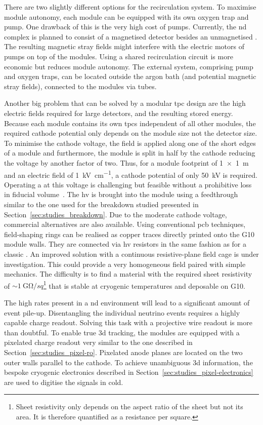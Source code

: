 There are two slightly different options for the recirculation system.
To maximise module autonomy, each module can be equipped with its own oxygen trap and \lar{} pump.
One drawback of this is the very high cost of \lar{} pumps.
Currently, the \dune{} \gls{nd} complex is planned to consist of a magnetised detector besides an unmagnetised \lartpc{}.
The resulting magnetic stray fields might interfere with the electric motors of \lar{} pumps on top of the modules.
Using a shared recirculation circuit is more economic but reduces module autonomy.
The external system, comprising pump and oxygen traps, can be located outside the argon bath (and potential magnetic stray fields), connected to the modules via tubes.

Another big problem that can be solved by a modular \gls{tpc} design are the high electric fields required for large detectors, and the resulting stored energy.
Because each module contains its own \glspl{tpc} independent of all other modules, the required cathode potential only depends on the module size not the detector size.
To minimise the cathode voltage, the field is applied along one of the short edges of a module and furthermore, the module is split in half by the cathode reducing the voltage by another factor of two.
Thus, for a module footprint of \SI{1 x 1}{\metre} and an electric field of \SI{1}{\kilo\volt\per\centi\metre}, a cathode potential of only \SI{50}{\kilo\volt} is required.
Operating a \lartpc{} at this voltage is challenging but feasible without a prohibitive loss in fiducial volume~\cite{AT}.
The \gls{hv} is brought into the module using a feedthrough similar to the one used for the breakdown studied presented in Section~\ref{sec:studies_breakdown}.
Due to the moderate cathode voltage, commercial alternatives are also available.
Using conventional \gls{pcb} techniques, field-shaping rings can be realised as copper traces directly printed onto the G10 module walls.
They are connected via \gls{hv} resistors in the same fashion as for a classic \lartpc{}.
An improved solution with a continuous resistive-plane field cage is under investigation.
This could provide a very homogeneous field paired with simple mechanics.
The difficulty is to find a material with the required sheet resistivity of $\sim{\SI{1}{\giga\ohm\per sq}}$\footnote{Sheet resistivity only depends on the aspect ratio of the sheet but not its area. It is therefore quantified as a resistance per square.} that is stable at cryogenic temperatures and deposable on G10.

The high rates present in a \gls{nd} environment will lead to a significant amount of event pile-up.
Disentangling the individual neutrino events requires a highly capable charge readout.
Solving this task with a projective wire readout is more than doubtful.
To enable true \gls{3d} tracking, the modules are equipped with a pixelated charge readout very similar to the one described in Section~\ref{sec:studies_pixel-ro}.
Pixelated anode planes are located on the two outer walls parallel to the cathode.
To achieve unambiguous \gls{3d} information, the bespoke \larpix{} cryogenic electronics described in Section~\ref{sec:studies_pixel-electronics} are used to digitise the signals in cold.

